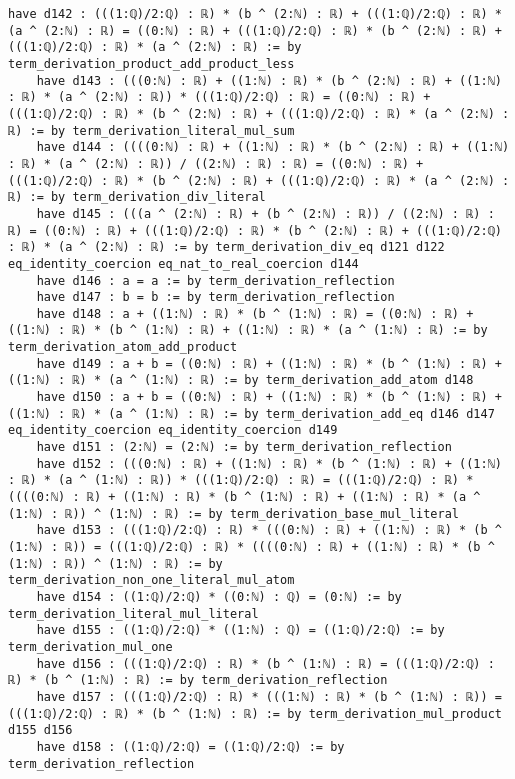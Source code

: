 \documentclass{article}
\begin{document}
\begin{tcolorbox}[colback=white!10, width=\linewidth]
\begin{lstlisting}[language=Lean4]
    have d142 : (((1:ℚ)/2:ℚ) : ℝ) * (b ^ (2:ℕ) : ℝ) + (((1:ℚ)/2:ℚ) : ℝ) * (a ^ (2:ℕ) : ℝ) = ((0:ℕ) : ℝ) + (((1:ℚ)/2:ℚ) : ℝ) * (b ^ (2:ℕ) : ℝ) + (((1:ℚ)/2:ℚ) : ℝ) * (a ^ (2:ℕ) : ℝ) := by term_derivation_product_add_product_less
    have d143 : (((0:ℕ) : ℝ) + ((1:ℕ) : ℝ) * (b ^ (2:ℕ) : ℝ) + ((1:ℕ) : ℝ) * (a ^ (2:ℕ) : ℝ)) * (((1:ℚ)/2:ℚ) : ℝ) = ((0:ℕ) : ℝ) + (((1:ℚ)/2:ℚ) : ℝ) * (b ^ (2:ℕ) : ℝ) + (((1:ℚ)/2:ℚ) : ℝ) * (a ^ (2:ℕ) : ℝ) := by term_derivation_literal_mul_sum
    have d144 : ((((0:ℕ) : ℝ) + ((1:ℕ) : ℝ) * (b ^ (2:ℕ) : ℝ) + ((1:ℕ) : ℝ) * (a ^ (2:ℕ) : ℝ)) / ((2:ℕ) : ℝ) : ℝ) = ((0:ℕ) : ℝ) + (((1:ℚ)/2:ℚ) : ℝ) * (b ^ (2:ℕ) : ℝ) + (((1:ℚ)/2:ℚ) : ℝ) * (a ^ (2:ℕ) : ℝ) := by term_derivation_div_literal
    have d145 : (((a ^ (2:ℕ) : ℝ) + (b ^ (2:ℕ) : ℝ)) / ((2:ℕ) : ℝ) : ℝ) = ((0:ℕ) : ℝ) + (((1:ℚ)/2:ℚ) : ℝ) * (b ^ (2:ℕ) : ℝ) + (((1:ℚ)/2:ℚ) : ℝ) * (a ^ (2:ℕ) : ℝ) := by term_derivation_div_eq d121 d122 eq_identity_coercion eq_nat_to_real_coercion d144
    have d146 : a = a := by term_derivation_reflection
    have d147 : b = b := by term_derivation_reflection
    have d148 : a + ((1:ℕ) : ℝ) * (b ^ (1:ℕ) : ℝ) = ((0:ℕ) : ℝ) + ((1:ℕ) : ℝ) * (b ^ (1:ℕ) : ℝ) + ((1:ℕ) : ℝ) * (a ^ (1:ℕ) : ℝ) := by term_derivation_atom_add_product
    have d149 : a + b = ((0:ℕ) : ℝ) + ((1:ℕ) : ℝ) * (b ^ (1:ℕ) : ℝ) + ((1:ℕ) : ℝ) * (a ^ (1:ℕ) : ℝ) := by term_derivation_add_atom d148
    have d150 : a + b = ((0:ℕ) : ℝ) + ((1:ℕ) : ℝ) * (b ^ (1:ℕ) : ℝ) + ((1:ℕ) : ℝ) * (a ^ (1:ℕ) : ℝ) := by term_derivation_add_eq d146 d147 eq_identity_coercion eq_identity_coercion d149
    have d151 : (2:ℕ) = (2:ℕ) := by term_derivation_reflection
    have d152 : (((0:ℕ) : ℝ) + ((1:ℕ) : ℝ) * (b ^ (1:ℕ) : ℝ) + ((1:ℕ) : ℝ) * (a ^ (1:ℕ) : ℝ)) * (((1:ℚ)/2:ℚ) : ℝ) = (((1:ℚ)/2:ℚ) : ℝ) * ((((0:ℕ) : ℝ) + ((1:ℕ) : ℝ) * (b ^ (1:ℕ) : ℝ) + ((1:ℕ) : ℝ) * (a ^ (1:ℕ) : ℝ)) ^ (1:ℕ) : ℝ) := by term_derivation_base_mul_literal
    have d153 : (((1:ℚ)/2:ℚ) : ℝ) * (((0:ℕ) : ℝ) + ((1:ℕ) : ℝ) * (b ^ (1:ℕ) : ℝ)) = (((1:ℚ)/2:ℚ) : ℝ) * ((((0:ℕ) : ℝ) + ((1:ℕ) : ℝ) * (b ^ (1:ℕ) : ℝ)) ^ (1:ℕ) : ℝ) := by term_derivation_non_one_literal_mul_atom
    have d154 : ((1:ℚ)/2:ℚ) * ((0:ℕ) : ℚ) = (0:ℕ) := by term_derivation_literal_mul_literal
    have d155 : ((1:ℚ)/2:ℚ) * ((1:ℕ) : ℚ) = ((1:ℚ)/2:ℚ) := by term_derivation_mul_one
    have d156 : (((1:ℚ)/2:ℚ) : ℝ) * (b ^ (1:ℕ) : ℝ) = (((1:ℚ)/2:ℚ) : ℝ) * (b ^ (1:ℕ) : ℝ) := by term_derivation_reflection
    have d157 : (((1:ℚ)/2:ℚ) : ℝ) * (((1:ℕ) : ℝ) * (b ^ (1:ℕ) : ℝ)) = (((1:ℚ)/2:ℚ) : ℝ) * (b ^ (1:ℕ) : ℝ) := by term_derivation_mul_product d155 d156
    have d158 : ((1:ℚ)/2:ℚ) = ((1:ℚ)/2:ℚ) := by term_derivation_reflection

\end{lstlisting}
\end{tcolorbox}
\end{document}
